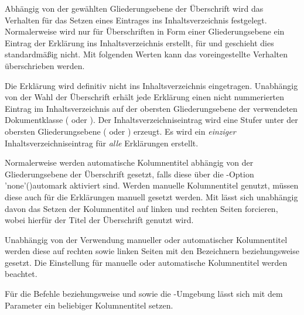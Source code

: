 \begin{DeclareEntity*}{}
\begin{DeclareEntity*}{}
\begin{DeclareEntity*}{}
\begin{Declaration}
Abhängig von der gewählten Gliederungsebene der Überschrift wird das Verhalten 
für das Setzen eines Eintrages ins Inhaltsverzeichnis festgelegt. Normalerweise 
wird nur für Überschriften in Form einer Gliederungsebene ein Eintrag der 
Erklärung ins Inhaltsverzeichnis erstellt, für  und 
 geschieht dies standardmäßig nicht. Mit folgenden 
Werten kann das voreingestellte Verhalten überschrieben werden.
\begin{DeclareValues}[Inhaltsverzeichnis]{}
  Die Erklärung wird definitiv nicht ins Inhaltsverzeichnis eingetragen.
  Unabhängig von der Wahl der Überschrift erhält jede Erklärung einen nicht
  nummerierten Eintrag im Inhaltsverzeichnis auf der obersten Gliederungsebene 
  der verwendeten Dokumentklasse ( oder ). 
  Der Inhaltsverzeichniseintrag wird eine Stufer unter der obersten 
  Gliederungsebene ( oder ) erzeugt.
  Es wird ein \emph{einziger} Inhaltsverzeichniseintrag für \emph{alle} 
  Erklärungen erstellt.
\end{DeclareValues}

%
%
Normalerweise werden automatische Kolumnentitel abhängig von der 
Gliederungsebene der Überschrift gesetzt, falls diese über die 
\KOMAScript-Option \Option'none'(){automark} 
aktiviert sind. Werden manuelle Kolumnentitel genutzt, müssen diese auch für 
die Erklärungen manuell gesetzt werden. Mit  lässt 
sich unabhängig davon das Setzen der Kolumnentitel auf linken und rechten 
Seiten forcieren, wobei hierfür der Titel der Überschrift genutzt wird.
\begin{DeclareValues}[Kolumnentitel]{}
  Unabhängig von der Verwendung manueller oder automatischer Kolumnentitel 
  werden diese auf rechten sowie linken Seiten mit den Bezeichnern 
   beziehungsweise  gesetzt.
  Die Einstellung für manuelle oder automatische Kolumnentitel werden beachtet.
\end{DeclareValues}
Für die Befehle  beziehungsweise  und 
 sowie die -Umgebung lässt sich mit 
dem Parameter  ein beliebiger Kolumnentitel 
setzen.


\end{Declaration}
\end{DeclareEntity*}
\end{DeclareEntity*}
\end{DeclareEntity*}
